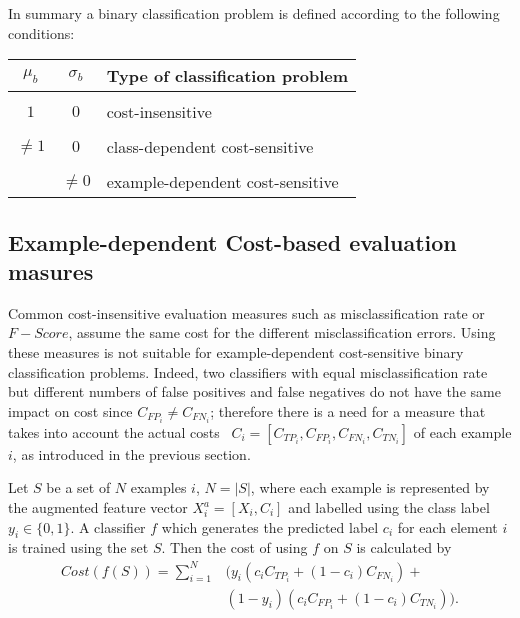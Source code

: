    In summary a binary classification problem is defined according to the following conditions:
    \begin{table}[h]
      \centering
      \begin{tabular}{c | c | l}
        $\mu_b$ & $\sigma_b$ & Type of classification problem \\
        \hline 
        && \\
        $1$ &  $0$ & cost-insensitive \\ &&\\
        $\ne 1$ & $0$ & class-dependent cost-sensitive \\ &&\\
        & $\ne 0$ & example-dependent cost-sensitive \\ 
      \end{tabular}
    \end{table}

\subsection{Example-dependent Cost-based evaluation masures}
    Common cost-insensitive evaluation measures such as misclassification rate or \mbox{$F-Score$}, 
    assume the same cost for the different misclassification errors. Using these measures is not 
    suitable for example-dependent cost-sensitive binary classification problems. Indeed, two 
    classifiers with equal misclassification rate but different numbers of false positives and 
    false negatives do not have the same impact on cost since \mbox{$C_{FP_i}\ne C_{FN_i}$};
    therefore there is a need for a measure that takes into account the actual costs 
    ~$C_i=[C_{TP_i},C_{FP_i},C_{FN_i},C_{TN_i}]$ of each example $i$, as introduced in 
    the previous section.
  
    Let $S$ be a set of $N$ examples $i$, $N=\vert S \vert$, where each example is represented by 
    the augmented feature vector \mbox{$X^a_i=[X_i, C_i]$} and labelled using the class label $y_i 
    \in \{0,1\}$.
    A classifier $f$ which generates the predicted label $c_i$ for each element $i$ is trained 
    using the set $S$. Then the cost of using $f$ on $S$ is calculated by
    \begin{align}\label{eq:cost}
      Cost(f(S)) = \sum_{i=1}^{N} & {\bigg( y_i(c_i C_{TP_i} + (1-c_i)C_{FN_i})} + \\
      & {(1-y_i)(c_i C_{FP_i} + (1-c_i)C_{TN_i}) \bigg)}.
    \end{align}

